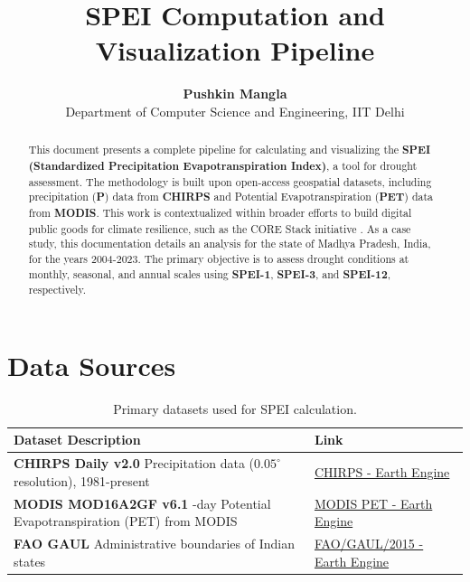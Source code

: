 \documentclass[12pt, a4paper]{article}
\title{\huge\textbf{SPEI Computation and Visualization Pipeline}}
\author{\large\textbf{Pushkin Mangla} \\ \normalsize{Department of Computer Science and Engineering, IIT Delhi}}
\date{}
\begin{document}
\maketitle
\tableofcontents
\newpage

\begin{abstract}
    \noindent This document presents a complete pipeline for calculating and visualizing the \textbf{SPEI (Standardized Precipitation Evapotranspiration Index)}, a tool for drought assessment. The methodology is built upon open-access geospatial datasets, including precipitation (\textbf{P}) data from \textbf{CHIRPS} and Potential Evapotranspiration (\textbf{PET}) data from \textbf{MODIS}. This work is contextualized within broader efforts to build digital public goods for climate resilience, such as the CORE Stack initiative \cite{seth2024core}.
    \newline\newline
    As a case study, this documentation details an analysis for the state of Madhya Pradesh, India, for the years 2004-2023. The primary objective is to assess drought conditions at monthly, seasonal, and annual scales using \textbf{SPEI-1}, \textbf{SPEI-3}, and \textbf{SPEI-12}, respectively.
\end{abstract}

\section{Data Sources}

\begin{table}[h!]
    \centering
    \caption{Primary datasets used for SPEI calculation.}
    \begin{tabular}{p{6cm} p{6cm}}
        \toprule
        \textbf{Dataset Description} & \textbf{Link} \\
        \midrule
        \textbf{CHIRPS Daily v2.0} \newline Precipitation data ($0.05^{\circ}$ resolution), 1981-present & \href{https://developers.google.com/earth-engine/datasets/catalog/UCSB-CHG_CHIRPS_DAILY}{CHIRPS - Earth Engine} \\
        \addlinespace
        \textbf{MODIS MOD16A2GF v6.1} \newline 8-day Potential Evapotranspiration (PET) from MODIS & \href{https://developers.google.com/earth-engine/datasets/catalog/MODIS_061_MOD16A2GF}{MODIS PET - Earth Engine} \\
        \addlinespace
        \textbf{FAO GAUL} \newline Administrative boundaries of Indian states & \href{https://developers.google.com/earth-engine/datasets/catalog/FAO_GAUL_2015_level1}{FAO/GAUL/2015 - Earth Engine} \\
        \bottomrule
    \end{tabular}
\end{table}
\end{document}
